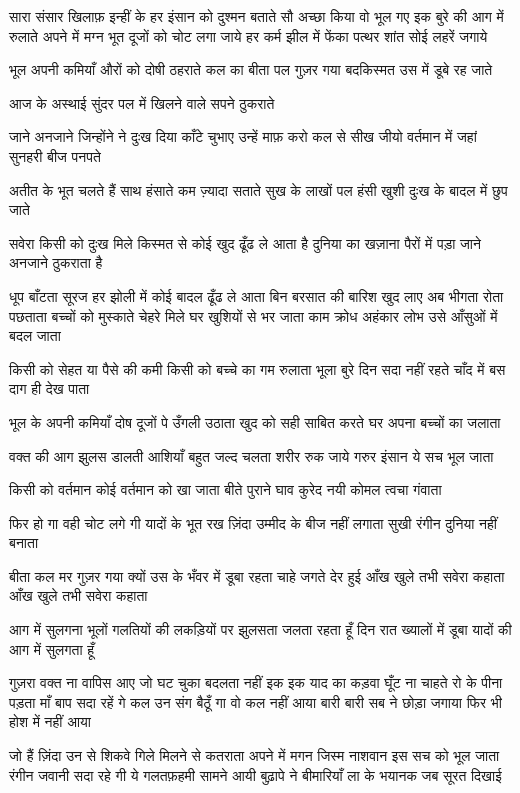 सारा संसार खिलाफ़ इन्हीं के
हर इंसान को दुश्मन बताते
सौ अच्छा किया वो भूल गए
इक बुरे की आग में रुलाते
अपने में मग्न भूत
दूजों को चोट लगा जाये
हर कर्म झील में फेंका पत्थर
शांत सोई लहरें जगाये

भूल अपनी कमियाँ
औरों को दोषी ठहराते
कल का बीता पल गुज़र गया
बदकिस्मत उस में डूबे रह जाते

आज के अस्थाई सुंदर पल में
खिलने वाले सपने ठुकराते

जाने अनजाने जिन्होंने ने दुःख दिया
काँटे चुभाए उन्हें माफ़ करो
कल से सीख जीयो वर्तमान में
जहां सुनहरी बीज पनपते

अतीत के भूत चलते हैं साथ
हंसाते कम ज़्यादा सताते
सुख के लाखों पल हंसी खुशी
दुःख के बादल में छुप जाते

सवेरा
किसी को दुःख मिले किस्मत से
कोई खुद ढूँढ ले आता है 
दुनिया का खज़ाना पैरों में पड़ा
जाने अनजाने ठुकराता है 

धूप बाँटता सूरज हर झोली में
कोई बादल ढूँढ ले आता
बिन बरसात की बारिश खुद लाए
अब भीगता रोता पछताता
बच्चों को मुस्काते चेहरे मिले
घर खुशियों से भर जाता
काम क्रोध अहंकार लोभ
उसे आँसुओं में बदल जाता

किसी को सेहत या पैसे की कमी
किसी को बच्चे का गम रुलाता
भूला बुरे दिन सदा नहीं रहते
चाँद में बस दाग ही देख पाता


भूल के अपनी कमियाँ दोष
दूजों पे उँगली उठाता
खुद को सही साबित करते
घर अपना बच्चों का जलाता

वक्त की आग झुलस डालती
आशियाँ बहुत जल्द
चलता शरीर रुक जाये
गरुर इंसान ये सच भूल जाता

किसी को वर्तमान कोई
वर्तमान को खा जाता
बीते पुराने घाव कुरेद
नयी कोमल त्वचा गंवाता

फिर हो गा वही चोट लगे गी
यादों के भूत रख ज़िंदा
उम्मीद के बीज नहीं लगाता
सुखी रंगीन दुनिया नहीं बनाता

बीता कल मर गुज़र गया
क्यों उस के भँवर में डूबा रहता
चाहे जगते देर हुई
आँख खुले तभी सवेरा कहाता
आँख खुले तभी सवेरा कहाता

आग में सुलगना
भूलों गलतियों की लकड़ियों पर
झुलसता जलता रहता हूँ
दिन रात ख्यालों में डूबा
यादों की आग में सुलगता हूँ 

गुज़रा वक्त ना वापिस आए
जो घट चुका बदलता नहीं
इक इक याद का कड़वा घूँट
ना चाहते रो के पीना पड़ता
माँ बाप सदा रहें गे
कल उन संग बैठूँ गा
वो कल नहीं आया
बारी बारी सब ने छोड़ा जगाया
फिर भी होश में नहीं आया

जो हैं ज़िंदा उन से शिकवे गिले
मिलने से कतराता
अपने में मगन जिस्म नाशवान
इस सच को भूल जाता
रंगीन जवानी सदा रहे गी
ये गलतफ़हमी सामने आयी
बुढ़ापे ने बीमारियाँ ला के
भयानक जब सूरत दिखाई

